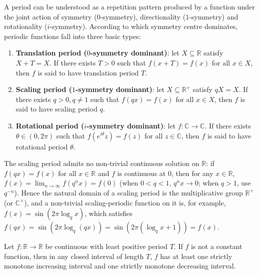 \begin{definition}\label{def:periodicity}
A period can be understood as a repetition pattern produced by a function under the joint action of symmetry ($0$-symmetry), directionality ($1$-symmetry) and rotationality ($i$-symmetry). According to which symmetry centre dominates, periodic functions fall into three basic types:
\begin{enumerate}[label=(\roman*)]
    \item \textbf{Translation period ($0$-symmetry dominant)}: let $X \subseteq \mathbb{R}$ satisfy $X + T = X$. If there exists $T > 0$ such that $f(x+T) = f(x)$ for all $x \in X$, then $f$ is said to have translation period $T$.
    \item \textbf{Scaling period ($1$-symmetry dominant)}: let $X \subseteq \mathbb{R}^+$ satisfy $qX = X$. If there exists $q > 0, q \neq 1$ such that $f(qx) = f(x)$ for all $x \in X$, then $f$ is said to have scaling period $q$.
    \item \textbf{Rotational period ($i$-symmetry dominant)}: let $f: \mathbb{C} \to \mathbb{C}$. If there exists $\theta \in (0, 2\pi)$ such that $f(e^{i\theta}z) = f(z)$ for all $z \in \mathbb{C}$, then $f$ is said to have rotational period $\theta$.
\end{enumerate}
\end{definition}

\begin{remark}\label{rem:scaling_period_nontrivial}
The scaling period admits no non-trivial continuous solution on $\mathbb{R}$: if $f(qx) = f(x)$ for all $x \in \mathbb{R}$ and $f$ is continuous at $0$, then for any $x \in \mathbb{R}$, $f(x) = \lim_{n\to\infty} f(q^n x) = f(0)$ (when $0 < q < 1$, $q^n x \to 0$; when $q > 1$, use $q^{-n}$). Hence the natural domain of a scaling period is the multiplicative group $\mathbb{R}^+$ (or $\mathbb{C}^\times$), and a non-trivial scaling-periodic function on it is, for example, $f(x) = \sin(2\pi \log_q x)$, which satisfies $f(qx) = \sin(2\pi \log_q(qx)) = \sin(2\pi(\log_q x + 1)) = f(x)$.
\end{remark}

\begin{theorem}\label{thm:periodic_monotone_intervals}
Let $f: \mathbb{R} \to \mathbb{R}$ be continuous with least positive period $T$. If $f$ is not a constant function, then in any closed interval of length $T$, $f$ has at least one strictly monotone increasing interval and one strictly monotone decreasing interval.
\end{theorem}

